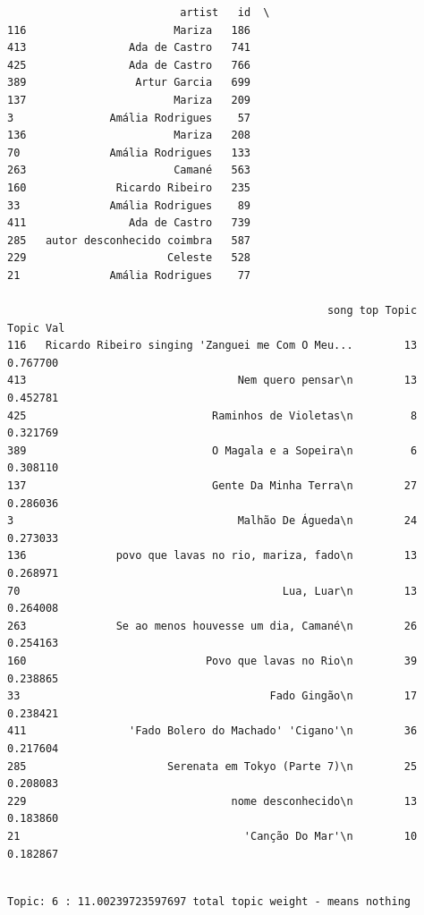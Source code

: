 \documentclass[11pt]{article}
\begin{document}
    
    \begin{verbatim}
                           artist   id  \
116                       Mariza   186   
413                Ada de Castro   741   
425                Ada de Castro   766   
389                 Artur Garcia   699   
137                       Mariza   209   
3               Amália Rodrigues    57   
136                       Mariza   208   
70              Amália Rodrigues   133   
263                       Camané   563   
160              Ricardo Ribeiro   235   
33              Amália Rodrigues    89   
411                Ada de Castro   739   
285   autor desconhecido coimbra   587   
229                      Celeste   528   
21              Amália Rodrigues    77   

                                                  song top Topic  Topic Val  
116   Ricardo Ribeiro singing 'Zanguei me Com O Meu...        13   0.767700  
413                                 Nem quero pensar\n        13   0.452781  
425                             Raminhos de Violetas\n         8   0.321769  
389                             O Magala e a Sopeira\n         6   0.308110  
137                             Gente Da Minha Terra\n        27   0.286036  
3                                   Malhão De Águeda\n        24   0.273033  
136              povo que lavas no rio, mariza, fado\n        13   0.268971  
70                                         Lua, Luar\n        13   0.264008  
263              Se ao menos houvesse um dia, Camané\n        26   0.254163  
160                            Povo que lavas no Rio\n        39   0.238865  
33                                       Fado Gingão\n        17   0.238421  
411                'Fado Bolero do Machado' 'Cigano'\n        36   0.217604  
285                      Serenata em Tokyo (Parte 7)\n        25   0.208083  
229                                nome desconhecido\n        13   0.183860  
21                                   'Canção Do Mar'\n        10   0.182867  
    \end{verbatim}

    
    \begin{Verbatim}[commandchars=\\\{\}]

Topic: 6 : 11.00239723597697 total topic weight - means nothing

    \end{Verbatim}
\end{document}

